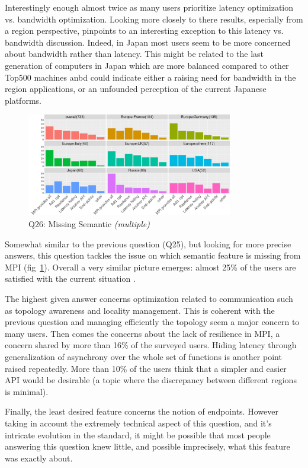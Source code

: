 \documentclass[conference,10pt,letterpaper]{IEEEtran}
\begin{document}
{Interestingly enough almost twice as many users prioritize latency
optimization vs. bandwidth optimization. Looking more closely to there
results, especially from a region perspective, pinpoints to an
interesting exception to this latency vs. bandwidth discussion.
Indeed, in Japan most users seem to be more concerned about bandwidth
rather than latency. This might be related to the last generation of
computers in Japan which are more balanced compared to other Top500
machines anbd could indicate either a raising need for bandwidth in
the region applications, or an unfounded perception of the current
Japanese platforms.

\begin{figure}[htb]
\begin{center}
\includegraphics[width=9cm]{R-scripts/Q26.pdf}
\caption{Q26: Missing Semantic {\it(multiple)}}
\label{fig:com_sem}
\end{center}
\end{figure}

Somewhat similar to the previous question (Q25), but looking for more
precise answers, this question tackles the issue on which semantic
feature is missing from MPI (fig~\ref{fig:com_sem}). Overall a very
similar picture emerges: almost 25\% of the users are satisfied with
the current situation .

The highest given answer concerns optimization related to
communication such as topology awareness and locality management. This
is coherent with the previous question and managing efficiently the
topology seem a major concern to many users. Then comes the concerns
about the lack of resilience in MPI, a concern shared by more than
16\% of the surveyed users. Hiding latency through generalization of
asynchrony over the whole set of functions is another point raised
repeatedly. More than 10\% of the users think that a simpler and
easier API would be desirable (a topic where the discrepancy between
different regions is minimal).

Finally, the least desired feature concerns the notion of endpoints.
However taking in account the extremely technical aspect of this
question, and it's intricate evolution in the standard, it might be
possible that most people answering this question knew little, and
possible imprecisely, what this feature was exactly about.

}
\end{document}
